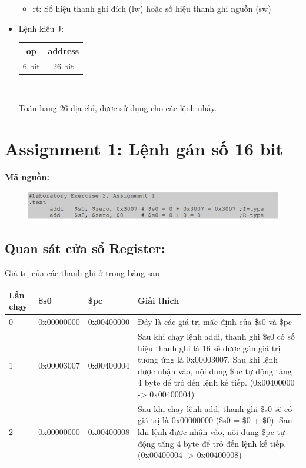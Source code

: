 \documentclass[12pt,a4paper,oneside]{article}
\begin{document}
\begin{itemize}
\begin{itemize}
	\item rt: Số hiệu thanh ghi đích (lw) hoặc số hiệu thanh ghi nguồn (sw)	
	\end{itemize}
\item Lệnh kiểu J:
\begin{center}
\begin{tabular}{|c|c|}
\hline 
op & address \\ 
\hline 
6 bit & 26 bit \\ 
\hline 
\end{tabular} \\
\end{center}
Toán hạng 26 địa chỉ, được sử dụng cho các lệnh nhảy.

\end{itemize}
\pagebreak
\section{Assignment 1: Lệnh gán số 16 bit}
	\textbf{Mã nguồn:}
	
	\begin{center}
    		\begin{figure}[htp]
    		\begin{center}
     	\includegraphics[scale=1]{image/1}
    		\end{center}
    		\label{refhinh1}
    		\end{figure}
	\end{center}
	
	\subsection{Quan sát cửa sổ Register:}
	Giá trị của các thanh ghi ở trong bảng sau\\
	\begin{center}
	 \begin{tabular}{|l|l|l|>{\raggedright\arraybackslash}p{8cm}|}
	\hline 
	Lần chạy & \$s0 & \$pc & Giải thích \\ 
	\hline 
	0 & 0x00000000 & 0x00400000 & Đây là các giá trị mặc định của \$s0 và \$pc \\ 
	\hline 
	1 & 0x00003007 & 0x00400004 & Sau khi chạy lệnh addi, thanh ghi \$s0 có số hiệu thanh ghi là 16 sẽ được gán giá trị tương ứng là 0x00003007. Sau khi lệnh được nhận vào, nội dung \$pc tự động tăng 4 byte để trỏ đến lệnh kế tiếp. (0x00400000 -> 0x00400004) \\ 
	\hline 
	2 & 0x00000000 & 0x00400008 & Sau khi chạy lệnh add, thanh ghi \$s0 sẽ có giá trị là 0x00000000 (\$s0 = \$0 + \$0). Sau khi lệnh được nhận vào, nội dung \$pc tự động tăng 4 byte để trỏ đến lệnh kế tiếp. (0x00400004 -> 0x00400008) \\ 
	\hline 
	\end{tabular}
	 \end{center} 
\end{document}
